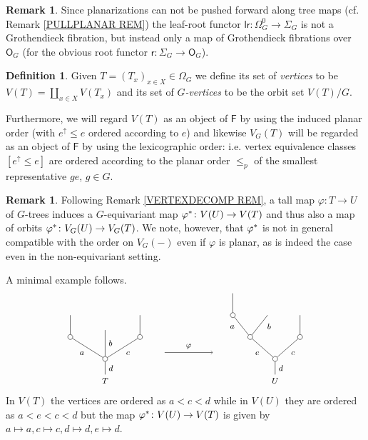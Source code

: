 \documentclass[a4paper,10pt
,draft
]{article}%
\numberwithin{equation}{section}
\numberwithin{figure}{section}
\theoremstyle{definition} %
\newtheorem{definition}[equation]{Definition}%
\newtheorem{remark}[equation]{Remark}%
\newcommand{\Fin}{\mathsf{F}}%
\newcommand{\1}{\ensuremath{\mathbbm 1}}%
\begin{document}
\begin{remark}\label{LRROOTMAP REM}
	Since planarizations can not be pushed forward along tree maps (cf. Remark \ref{PULLPLANAR REM})
the leaf-root functor $\mathsf{lr} \colon \Omega_{G}^0 \to \Sigma_G$ is not a Grothendieck fibration,
but instead only a map of Grothendieck fibrations over $\mathsf{O}_G$ 
(for the obvious root functor $\mathsf{r} \colon \Sigma_G \to \mathsf{O}_G$).
\end{remark}


\begin{definition}\label{VG DEF}
Given $T = (T_x)_{x \in X} \in \Omega_G$ we define its set of \textit{vertices} to be $V(T) = \coprod_{x \in X} V(T_x)$
and its set of
	\textit{$G$-vertices} to be the orbit set $V(T)/G$.
	
Furthermore, we will regard 
$V(T)$ as an object of $\Fin$ by using the induced planar order
(with $e^{\uparrow}\leq e$ ordered according to $e$)
and likewise $V_G(T)$ will be regarded as an object of $\Fin$ by using the lexicographic order: i.e. vertex equivalence classes 
$[e^{\uparrow} \leq e]$ are ordered according to the planar order $\leq_p$ of the smallest representative $ge$, $g \in G$.
\end{definition}


\begin{remark}\label{VERTEXDECOMPG REM}
	Following Remark \ref{VERTEXDECOMP REM},
	a tall map $\varphi \colon T \to U$ of $G$-trees
	induces a $G$-equivariant map
	$\varphi^{\**} \colon V(U) \to V(T)$
	and thus also a map of orbits
	$\varphi^{\**} \colon V_G(U) \to V_G(T)$.
	We note, however, that $\varphi^{\**}$ is not in general compatible with the order on $V_G(\minus)$ even if $\varphi$ is planar, as is indeed the case even in the non-equivariant setting.

A minimal example follows.
		\[
		\begin{tikzpicture}[grow=up,auto,level distance=2.2em,
		every node/.style = {font=\footnotesize},
		dummy/.style={circle,draw,inner sep=0pt,minimum size=1.75mm}]
		\node at (0,0) {$T$}
			child{node [dummy] {}
				child[sibling distance = 3.5em]{node [dummy] {}
					child
				edge from parent node[swap] {$c$}}
				child[level distance=2.9em]{
				edge from parent node [swap] {$b$}}
				child[sibling distance = 3.5em]{node [dummy] {}
					child
				edge from parent node {$a$}}		
			edge from parent node [swap] {$d$}};
		\node at (6,0) {$U$}
			child{node [dummy] {}
				child[sibling distance = 5em]{node [dummy] {}
					child
				edge from parent node [swap] {$c$}}
				child[sibling distance = 5em]{node [dummy] {}
					child[sibling distance = 3.5em]{
					edge from parent node [swap,near end] {$b$}}
					child[sibling distance = 3.5em]{node [dummy] {}
						child
					edge from parent node [near end]{$a$}}
				edge from parent node {$e$}}
			edge from parent node [swap] {$d$}};
		\draw[->] (2.1,1) -- node [above] {$\varphi$} (3.8,1) ;
		\end{tikzpicture}
		\]
In $V(T)$ the vertices are ordered as $a<c<d$ while in $V(U)$ they are ordered as $a<e<c<d$ but the map 
$\varphi^{\**} \colon V(U) \to V(T)$ is given by 
$a \mapsto a, c \mapsto c, d \mapsto d, e \mapsto d$.
\end{remark}
\end{document}
